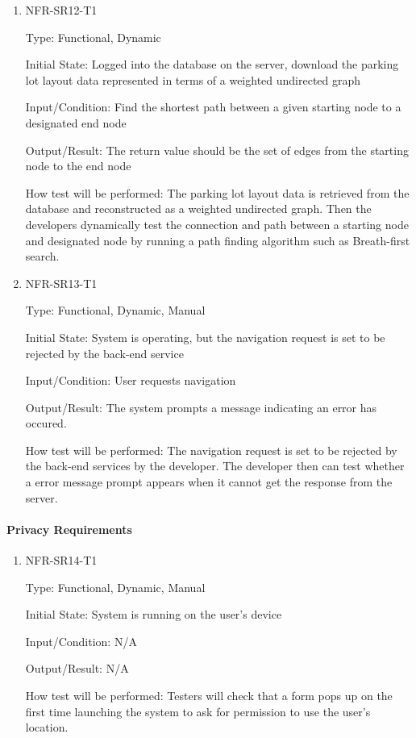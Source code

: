 \documentclass[12pt, titlepage]{article}
\begin{document}
\begin{enumerate}
\item{NFR-SR12-T1}

Type: Functional, Dynamic
					
Initial State: Logged into the database on the server, download the parking lot
layout data represented in terms of a weighted undirected graph
					
Input/Condition: Find the shortest path between a given starting node to a
designated end node
					
Output/Result: The return value should be the set of edges from the starting
node to the end node
					
How test will be performed: The parking lot layout data is retrieved from the
database and reconstructed as a weighted undirected graph. Then the developers
dynamically test the connection and path between a starting node and designated
node by running a path finding algorithm such as Breath-first search.
\item{NFR-SR13-T1}

Type: Functional, Dynamic, Manual
					
Initial State: System is operating, but the navigation request is set to be
rejected by the back-end service
					
Input/Condition: User requests navigation
					
Output/Result: The system prompts a message indicating an error has occured.
					
How test will be performed: The navigation request is set to be rejected by the
back-end services by the developer. The developer then can test whether a error
message prompt appears when it cannot get the response from the server.

\end{enumerate}
\paragraph{Privacy Requirements}

\begin{enumerate}

\item{NFR-SR14-T1}

Type: Functional, Dynamic, Manual
					
Initial State: System is running on the user's device
					
Input/Condition: N/A
					
Output/Result: N/A
					
How test will be performed: Testers will check that a form pops up on the first
time launching the system to ask for permission to use the user's location.
					
\end{enumerate}
\end{document}
